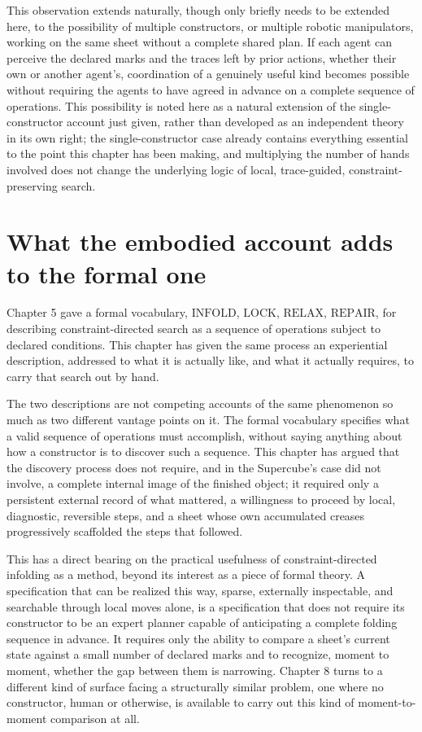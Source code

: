 \documentclass[11pt,oneside]{book}
\begin{document}
This observation extends naturally, though only briefly needs to be
extended here, to the possibility of multiple constructors, or multiple
robotic manipulators, working on the same sheet without a complete
shared plan. If each agent can perceive the declared marks and the
traces left by prior actions, whether their own or another agent's,
coordination of a genuinely useful kind becomes possible without
requiring the agents to have agreed in advance on a complete sequence of
operations. This possibility is noted here as a natural extension of the
single-constructor account just given, rather than developed as an
independent theory in its own right; the single-constructor case already
contains everything essential to the point this chapter has been making,
and multiplying the number of hands involved does not change the
underlying logic of local, trace-guided, constraint-preserving search.

\hypertarget{what-the-embodied-account-adds-to-the-formal-one}{%
\section{What the embodied account adds to the formal
one}\label{what-the-embodied-account-adds-to-the-formal-one}}

Chapter 5 gave a formal vocabulary, \(\text{INFOLD}\), \(\text{LOCK}\),
\(\text{RELAX}\), \(\text{REPAIR}\), for describing constraint-directed
search as a sequence of operations subject to declared conditions. This
chapter has given the same process an experiential description,
addressed to what it is actually like, and what it actually requires, to
carry that search out by hand.

The two descriptions are not competing accounts of the same phenomenon
so much as two different vantage points on it. The formal vocabulary
specifies what a valid sequence of operations must accomplish, without
saying anything about how a constructor is to discover such a sequence.
This chapter has argued that the discovery process does not require, and
in the Supercube's case did not involve, a complete internal image of
the finished object; it required only a persistent external record of
what mattered, a willingness to proceed by local, diagnostic, reversible
steps, and a sheet whose own accumulated creases progressively
scaffolded the steps that followed.

This has a direct bearing on the practical usefulness of
constraint-directed infolding as a method, beyond its interest as a
piece of formal theory. A specification that can be realized this way,
sparse, externally inspectable, and searchable through local moves
alone, is a specification that does not require its constructor to be an
expert planner capable of anticipating a complete folding sequence in
advance. It requires only the ability to compare a sheet's current state
against a small number of declared marks and to recognize, moment to
moment, whether the gap between them is narrowing. Chapter 8 turns to a
different kind of surface facing a structurally similar problem, one
where no constructor, human or otherwise, is available to carry out this
kind of moment-to-moment comparison at all.
\end{document}
